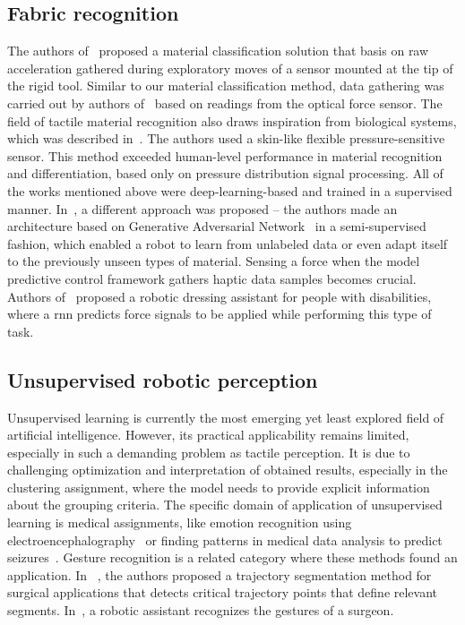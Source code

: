 \documentclass[a4paper, 10pt, twoside]{report}
\begin{document}
\subsection{Fabric recognition}
\label{part:methods:materials:rw:fabric}

The authors of~\cite{Ji2015Preprocessing-freeAutoencoder} proposed a material classification solution that basis on raw acceleration gathered during exploratory moves of a sensor mounted at the tip of the rigid tool. Similar to our material classification method, data gathering was carried out by authors of~\cite{Kerzel2017} based on readings from the optical force sensor. The field of tactile material recognition also draws inspiration from biological systems, which was described in~\cite{Tulbure2018}. The authors used a skin-like flexible pressure-sensitive sensor. This method exceeded human-level performance in material recognition and differentiation, based only on pressure distribution signal processing. All of the works mentioned above were deep-learning-based and trained in a supervised manner. In~\cite{Erickson2017Semi-SupervisedNetworks}, a different approach was proposed -- the authors made an architecture based on Generative Adversarial Network~\cite{GAN} in a semi-supervised fashion, which enabled a robot to learn from unlabeled data or even adapt itself to the previously unseen types of material. Sensing a force when the model predictive control framework gathers haptic data samples becomes crucial. Authors of~\cite{Erickson2017} proposed a robotic dressing assistant for people with disabilities, where a \acrshort{rnn} predicts force signals to be applied while performing this type of task. 

\subsection{Unsupervised robotic perception}
\label{part:methods:materials:rw:unsupervised}

Unsupervised learning is currently the most emerging yet least explored field of artificial intelligence. However, its practical applicability remains limited, especially in such a demanding problem as tactile perception. It is due to challenging optimization and interpretation of obtained results, especially in the clustering assignment, where the model needs to provide explicit information about the grouping criteria. The specific domain of application of unsupervised learning is medical assignments, like emotion recognition using electroencephalography~\cite{medicine2} or finding patterns in medical data analysis to predict seizures~\cite{medicine1}. Gesture recognition is a related category where these methods found an application. In ~\cite{gesture1}, the authors proposed a trajectory segmentation method for surgical applications that detects critical trajectory points that define relevant segments. In~\cite{gesture2}, a robotic assistant recognizes the gestures of a surgeon. 
\end{document}
